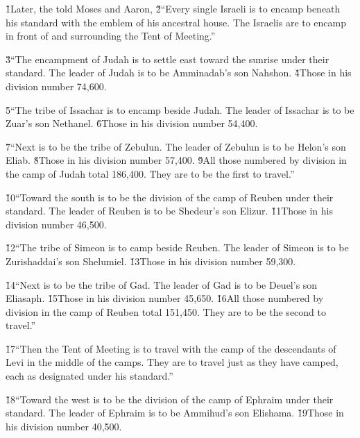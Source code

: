 \v{1}Later, the  told Moses and Aaron, \v{2}``Every single Israeli is to encamp beneath his standard with the emblem of his ancestral house. The Israelis are to encamp in front of and surrounding the Tent of Meeting.''

\v{3}``The encampment of Judah is to settle east toward the sunrise under their standard. The leader of Judah is to be Amminadab's son Nahshon. \v{4}Those in his division number 74,600.

\v{5}``The tribe of Issachar is to encamp beside Judah. The leader of Issachar is to be Zuar's son Nethanel. \v{6}Those in his division number 54,400.

\v{7}``Next is to be the tribe of Zebulun. The leader of Zebulun is to be Helon's son Eliab. \v{8}Those in his division number 57,400. \v{9}All those numbered by division in the camp of Judah total 186,400. They are to be the first to travel.''

\v{10}``Toward the south is to be the division of the camp of Reuben under their standard. The leader of Reuben is to be Shedeur's son Elizur. \v{11}Those in his division number 46,500.

\v{12}``The tribe of Simeon is to camp beside Reuben. The leader of Simeon is to be Zurishaddai's son Shelumiel. \v{13}Those in his division number 59,300.

\v{14}``Next is to be the tribe of Gad. The leader of Gad is to be Deuel's son Eliasaph. \v{15}Those in his division number 45,650. \v{16}All those numbered by division in the camp of Reuben total 151,450. They are to be the second to travel.''

\v{17}``Then the Tent of Meeting is to travel with the camp of the descendants of Levi in the middle of the camps. They are to travel just as they have camped, each as designated under his standard.''

\v{18}``Toward the west is to be the division of the camp of Ephraim under their standard. The leader of Ephraim is to be Ammihud's son Elishama. \v{19}Those in his division number 40,500.

